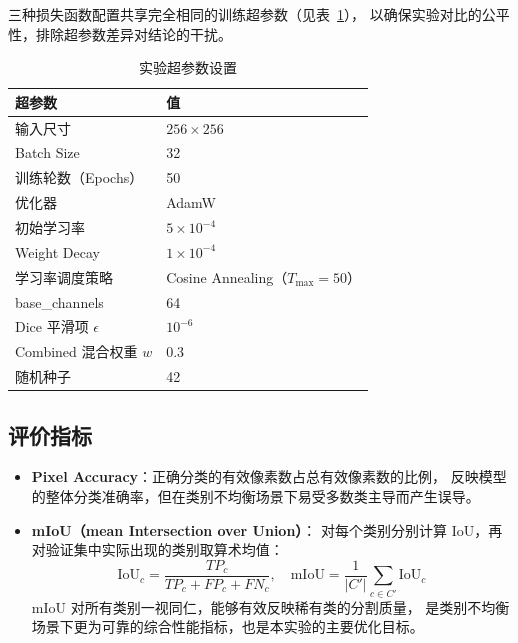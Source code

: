 \documentclass[12pt, a4paper]{article}
\begin{document}
三种损失函数配置共享完全相同的训练超参数（见表~\ref{tab:hyperparams}），
以确保实验对比的公平性，排除超参数差异对结论的干扰。

\begin{table}[H]
    \centering
    \caption{实验超参数设置}
    \label{tab:hyperparams}
    \begin{tabular}{ll}
        \toprule
        超参数 & 值 \\
        \midrule
        输入尺寸               & $256 \times 256$ \\
        Batch Size             & 32 \\
        训练轮数（Epochs）     & 50 \\
        优化器                 & AdamW \\
        初始学习率             & $5 \times 10^{-4}$ \\
        Weight Decay           & $1 \times 10^{-4}$ \\
        学习率调度策略         & Cosine Annealing（$T_{\max}=50$）\\
        base\_channels         & 64 \\
        Dice 平滑项 $\epsilon$ & $10^{-6}$ \\
        Combined 混合权重 $w$  & 0.3 \\
        随机种子               & 42 \\
        \bottomrule
    \end{tabular}
\end{table}

\subsection{评价指标}

\begin{itemize}
    \item \textbf{Pixel Accuracy}：正确分类的有效像素数占总有效像素数的比例，
          反映模型的整体分类准确率，但在类别不均衡场景下易受多数类主导而产生误导。
    \item \textbf{mIoU（mean Intersection over Union）}：
          对每个类别分别计算 IoU，再对验证集中实际出现的类别取算术均值：
          \[
              \text{IoU}_c = \frac{TP_c}{TP_c + FP_c + FN_c}, \quad
              \text{mIoU} = \frac{1}{|C'|} \sum_{c \in C'} \text{IoU}_c
          \]
          mIoU 对所有类别一视同仁，能够有效反映稀有类的分割质量，
          是类别不均衡场景下更为可靠的综合性能指标，也是本实验的主要优化目标。
\end{itemize}
\end{document}
